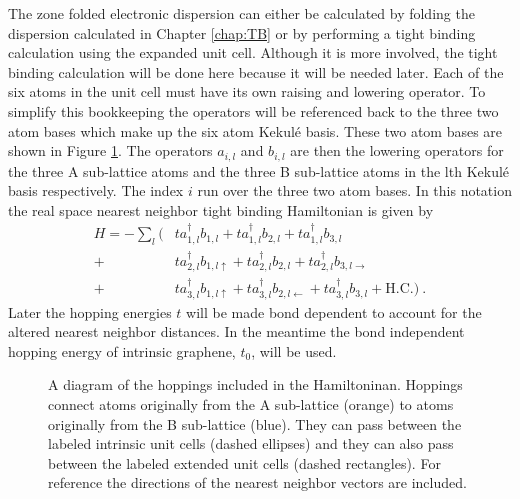 The zone folded electronic dispersion can either be calculated by folding the dispersion calculated in Chapter \ref{chap:TB} or by performing a tight binding calculation using the expanded unit cell.
Although it is more involved, the tight binding calculation will be done here because it will be needed later.
Each of the six atoms in the unit cell must have its own raising and lowering operator.
To simplify this bookkeeping the operators will be referenced back to the three two atom bases which make up the six atom Kekul\'e basis.
These two atom bases are shown in Figure \ref{fig:kek:hoppings}.
The operators $a_{i,l}$ and $b_{i,l}$ are then the lowering operators for the three A sub-lattice atoms and the three B sub-lattice atoms in the lth Kekul\'e basis respectively.
The index $i$ run over the three two atom bases.
In this notation the real space nearest neighbor tight binding Hamiltonian is given by
\newcommand{\rl}[4]{
	a^{\dagger}_{#1,#2} b_{#3,#4}
}
\begin{align}
	H=-\sum_l (
		 & t \rl{1}{l}{1}{l        }+t\rl{1}{l}{2}{l          }+t\rl{1}{l}{3}{l           } \nonumber \\
		+& t \rl{2}{l}{1}{l\uparrow}+t\rl{2}{l}{2}{l          }+t\rl{2}{l}{3}{l\rightarrow} \nonumber \\ 
		+& t \rl{3}{l}{1}{l\uparrow}+t\rl{3}{l}{2}{l\leftarrow}+t\rl{3}{l}{3}{l           } + \text{H.C.} ) \ .
		\label{eq:kek:Hreal}
\end{align}
Later the hopping energies $t$ will be made bond dependent to account for the altered nearest neighbor distances.
In the meantime the bond independent hopping energy of intrinsic graphene, $t_0$, will be used.

\begin{figure}
	\begin{center}
	
	\end{center}
	\caption[Diagram of the hoppings in the expanded Kekul\'e unit cell]{\label{fig:kek:hoppings}
		A diagram of the hoppings included in the Hamiltoninan.
		Hoppings connect atoms originally from the A sub-lattice (orange) to atoms originally from the B sub-lattice (blue).
		They can pass between the labeled intrinsic unit cells (dashed ellipses) and they can also pass between the labeled extended unit cells (dashed rectangles).
		For reference the directions of the nearest neighbor vectors are included.
	}
\end{figure}

